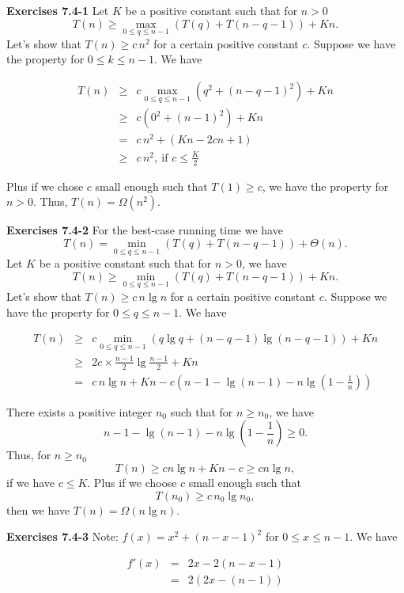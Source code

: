 \documentclass[a4paper,12pt]{article}
\newcommand{\newpar}[1]
{\bigskip \noindent \textbf{Exercises #1} \newline}
\begin{document}
\newpar{7.4-1}
Let $K$ be a positive constant such that for $n > 0$
\[ T(n) \ge \max_{0 \le q\le n-1}\left(T(q) + T(n-q-1)\right) + Kn.\]
Let's show that $T(n) \ge c\,n^2$ for a certain positive constant
$c$.  Suppose we have the property for $0 \le k\le n-1$.  We have

\begin{eqnarray*}
  T(n) &\ge& c\max_{0\le q\le n-1}\left(q^2 + (n-q-1)^2\right) +
  Kn \\ &\ge&
  c \left(0^2 + (n-1)^2\right) + Kn \\ &=&
  c\,n^2 + \left(Kn - 2cn + 1\right) \\ &\ge&
  c\,n^2,\ \mbox{if $c \le \frac{K}{2}$}
\end{eqnarray*}

Plus if we chose $c$ small enough such that $T(1) \ge c$,  we have the
property for $n > 0$.  Thus, $T(n) = \Omega(n^2)$.

\newpar{7.4-2}
For the best-case running time we have
\[ T(n) = \min_{0\le q \le n-1}\left(T(q) + T(n-q-1)\right) +
\Theta(n).\]
Let $K$ be a positive constant such that for $n > 0$, we have
\[ T(n) \ge \min_{0\le q \le n-1}\left(T(q) + T(n-q-1)\right) + Kn.\]
Let's show that $T(n) \ge c\,n\lg n$ for a certain positive constant
$c$.  Suppose we have the property for $0 \le q \le n-1$.  We have

\begin{eqnarray*}
  T(n) &\ge& c\min_{0\le q\le n-1}\left(q\lg q + (n-q-1)\lg
  (n-q-1)\right) + Kn \\ &\ge&
  2c \times \frac{n-1}{2} \lg \frac{n-1}{2} + Kn \\ &=&
  c\,n\lg n + Kn - c\left(n-1 - \lg(n-1) - n
  \lg\left(1-\frac{1}{n}\right)\right)
\end{eqnarray*}

There exists a positive integer $n_0$ such that for $n \ge n_0$, we
have
\[ n - 1 - \lg(n-1) - n\lg\left(1-\frac{1}{n}\right) \ge 0.\]
Thus, for $n \ge n_0$
\[ T(n) \ge cn\lg n + K n - c \ge cn\lg n,\]
if we have $c \le K$.  Plus if we choose $c$ small enough such that
\[ T(n_0) \ge c\,n_0 \lg n_0,\]
then we have $T(n) = \Omega(n\lg n)$.

\newpar{7.4-3}
Note: $f(x) = x^2 + (n - x - 1)^2$ for $0 \le x \le n-1$.  We have

\begin{eqnarray*}
  f'(x) &=& 2x - 2(n - x - 1) \\
  &=& 2\left(2x - (n-1)\right)
\end{eqnarray*}
\end{document}
